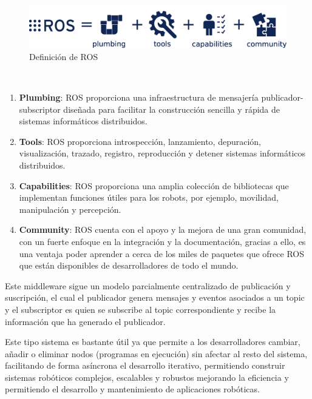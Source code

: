 \begin{figure} [H]
    \begin{center}
      \includegraphics[scale=0.18]{figs/Plataformas_Desarollo/ros-equation.png}
    \end{center}
    \caption{Definición de ROS}
    \label{fig:ROS}
  \end{figure}\


\begin{enumerate}
    \item \textbf{Plumbing}: ROS proporciona una infraestructura de mensajería publicador-subscriptor diseñada para facilitar la construcción sencilla y rápida de sistemas informáticos
    distribuidos.
    \item \textbf{Tools}: ROS proporciona introspección, lanzamiento, depuración, visualización, trazado, registro, reproducción y detener sistemas informáticos distribuidos.
    \item \textbf{Capabilities}: ROS proporciona una amplia colección de bibliotecas que implementan funciones útiles para los robots, por ejemplo, movilidad, manipulación y percepción.
    \item \textbf{Community}: ROS cuenta con el apoyo y la mejora de una gran comunidad, con un fuerte enfoque en la integración y la documentación, gracias a ello, es una ventaja poder
    aprender a cerca de los miles de paquetes que ofrece ROS que están disponibles de desarrolladores de todo el mundo.
\end{enumerate}

Este middleware sigue un modelo parcialmente centralizado de publicación y suscripción, el cual el publicador genera mensajes y eventos asociados a un topic y el subscriptor
es quien se subscribe al topic correspondiente y recibe la información que ha generado el publicador. \newline

Este tipo sistema es bastante útil ya que permite a los desarrolladores cambiar, añadir o eliminar nodos (programas en ejecución) sin afectar al resto del sistema, facilitando de forma asíncrona
el desarrollo iterativo, permitiendo construir sistemas robóticos complejos, escalables y robustos mejorando la eficiencia y permitiendo el desarrollo y mantenimiento de aplicaciones
robóticas. \newline

